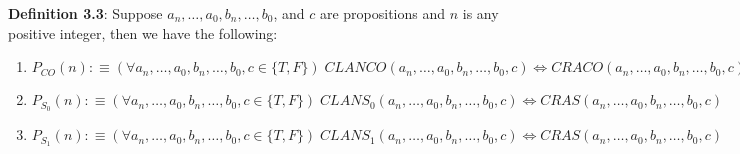 \documentclass{article}
\begin{document}
\noindent \textbf{Definition 3.3}: Suppose $a_n, \ldots, a_0, b_n, \ldots, b_0$, and $c$ are propositions and $n$ is any positive integer, then we have the following:
\begin{enumerate}
\item $ P_{CO}(n) :\equiv (\forall a_n, \ldots, a_0, b_n, \ldots, b_0, c \in \{T, F\} ) \;  CLANCO(a_n, \ldots, a_0, b_n, \ldots, b_0, c) \iff CRACO(a_n, \ldots, a_0, b_n, \ldots, b_0, c) $
\item  $P_{S_0}(n) :\equiv (\forall a_n, \ldots, a_0, b_n, \ldots, b_0, c \in \{T, F\} ) \;  CLANS_0(a_n, \ldots, a_0, b_n, \ldots, b_0, c) \iff CRAS(a_n, \ldots, a_0, b_n, \ldots, b_0, c) $
\item $P_{S_1}(n) :\equiv (\forall a_n, \ldots, a_0, b_n, \ldots, b_0, c \in \{T, F\} ) \;  CLANS_1(a_n, \ldots, a_0, b_n, \ldots, b_0, c) \iff CRAS(a_n, \ldots, a_0, b_n, \ldots, b_0, c) $
\end{enumerate}
\end{document}
